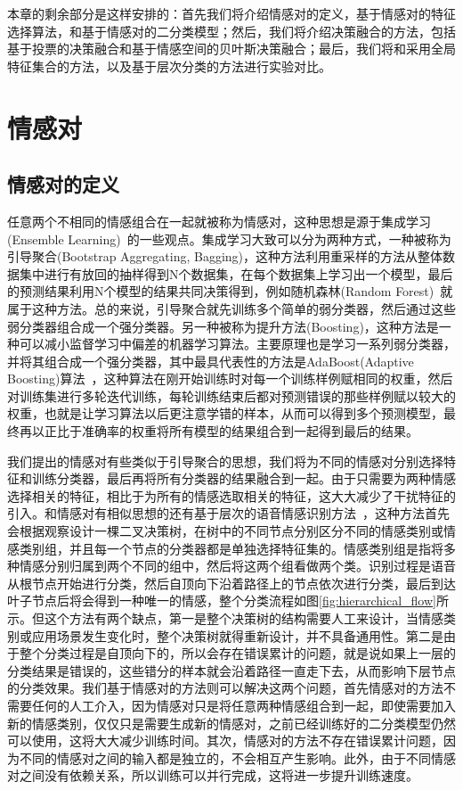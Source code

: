 本章的剩余部分是这样安排的：首先我们将介绍情感对的定义，基于情感对的特征选择算法，和基于情感对的二分类模型；然后，我们将介绍决策融合的方法，包括基于投票的决策融合和基于情感空间的贝叶斯决策融合；最后，我们将和采用全局特征集合的方法，以及基于层次分类的方法进行实验对比。



\section{情感对}
\label{sec:emo_pair}

\subsection{情感对的定义}
\label{ssec:emo_pair_def}
任意两个不相同的情感组合在一起就被称为情感对，这种思想是源于集成学习(Ensemble Learning)~\cite{Liu1999Ensemble}的一些观点。集成学习大致可以分为两种方式，一种被称为引导聚合(Bootstrap Aggregating, Bagging)，这种方法利用重采样的方法从整体数据集中进行有放回的抽样得到N个数据集，在每个数据集上学习出一个模型，最后的预测结果利用N个模型的结果共同决策得到，例如随机森林(Random Forest)~\cite{Liaw2002Classification}就属于这种方法。总的来说，引导聚合就先训练多个简单的弱分类器，然后通过这些弱分类器组合成一个强分类器。另一种被称为提升方法(Boosting)，这种方法是一种可以减小监督学习中偏差的机器学习算法。主要原理也是学习一系列弱分类器，并将其组合成一个强分类器，其中最具代表性的方法是AdaBoost(Adaptive Boosting)算法~\cite{Ratsch2001Soft}，这种算法在刚开始训练时对每一个训练样例赋相同的权重，然后对训练集进行多轮迭代训练，每轮训练结束后都对预测错误的那些样例赋以较大的权重，也就是让学习算法以后更注意学错的样本，从而可以得到多个预测模型，最终再以正比于准确率的权重将所有模型的结果组合到一起得到最后的结果。

我们提出的情感对有些类似于引导聚合的思想，我们将为不同的情感对分别选择特征和训练分类器，最后再将所有分类器的结果融合到一起。由于只需要为两种情感选择相关的特征，相比于为所有的情感选取相关的特征，这大大减少了干扰特征的引入。和情感对有相似思想的还有基于层次的语音情感识别方法~\cite{Lee2009Emotion}，这种方法首先会根据观察设计一棵二叉决策树，在树中的不同节点分别区分不同的情感类别或情感类别组，并且每一个节点的分类器都是单独选择特征集的。情感类别组是指将多种情感分别归属到两个不同的组中，然后将这两个组看做两个类。识别过程是语音从根节点开始进行分类，然后自顶向下沿着路径上的节点依次进行分类，最后到达叶子节点后将会得到一种唯一的情感，整个分类流程如图\ref{fig:hierarchical_flow}所示。但这个方法有两个缺点，第一是整个决策树的结构需要人工来设计，当情感类别或应用场景发生变化时，整个决策树就得重新设计，并不具备通用性。第二是由于整个分类过程是自顶向下的，所以会存在错误累计的问题，就是说如果上一层的分类结果是错误的，这些错分的样本就会沿着路径一直走下去，从而影响下层节点的分类效果。我们基于情感对的方法则可以解决这两个问题，首先情感对的方法不需要任何的人工介入，因为情感对只是将任意两种情感组合到一起，即使需要加入新的情感类别，仅仅只是需要生成新的情感对，之前已经训练好的二分类模型仍然可以使用，这将大大减少训练时间。其次，情感对的方法不存在错误累计问题，因为不同的情感对之间的输入都是独立的，不会相互产生影响。此外，由于不同情感对之间没有依赖关系，所以训练可以并行完成，这将进一步提升训练速度。

